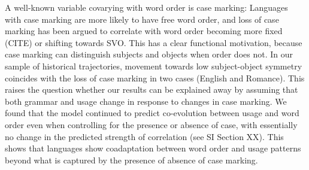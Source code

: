 \documentclass[11pt,a4paper]{article}
\begin{document}
A well-known variable covarying with word order is case marking: Languages with case marking are more likely to have free word order, and loss of case marking has been argued to correlate with word order becoming more fixed (CITE) or shifting towards SVO.
This has a clear functional motivation, because case marking can distinguish subjects and objects when order does not.
In our sample of historical trajectories, movement towards low subject-object symmetry coincides with the loss of case marking in two cases (English and Romance).
This raises the question whether our results can be explained away by assuming that both grammar and usage change in response to changes in case marking.
We found that the model continued to predict co-evolution between usage and word order even when controlling for the presence or absence of case, with essentially no change in the predicted strength of correlation (see SI Section XX).
This shows that languages show coadaptation between word order and usage patterns beyond what is captured by the presence of absence of case marking.

\end{document}
